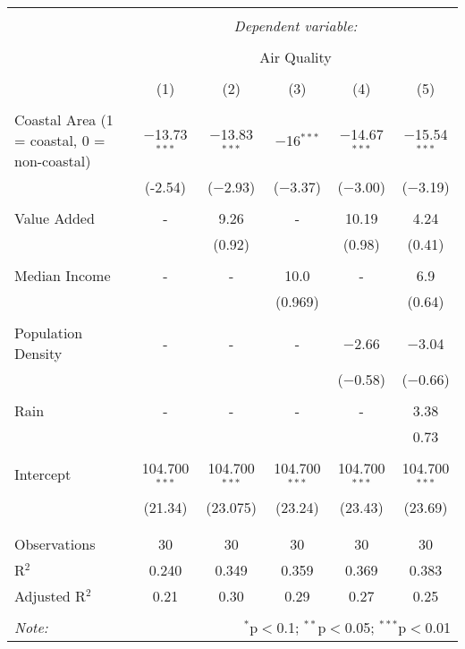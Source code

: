 \documentclass[
]{article}
\begin{document}
\begin{table}[!htbp] \centering 
  \label{} 
\begin{tabular}{@{\extracolsep{5pt}}lccccc} 
\\[-1.8ex]\hline 
\hline \\[-1.8ex] 
 & \multicolumn{5}{c}{\textit{Dependent variable:}} \\ 
\cline{2-6} 
\\[-1.8ex] & \multicolumn{5}{c}{Air Quality} \\ 
\\[-1.8ex] & (1) & (2) & (3) & (4) & (5)\\ 
\hline \\[-1.8ex] 
 Coastal Area (1 = coastal, 0 = non-coastal) & $-$13.73$^{***}$ & $-$13.83$^{***}$ & $-$16$^{***}$ & $-$14.67$^{***}$ & $-$15.54$^{***}$ \\ 
  & (-2.54) & ($-$2.93) & ($-$3.37) & ($-$3.00) & ($-$3.19) \\ 
  & & & & & \\ 
 Value Added & - & 9.26 & - & 10.19 & 4.24 \\ 
  &  & (0.92) &  & (0.98) & (0.41) \\ 
  & & & & & \\ 
 Median Income & - & - & 10.0 & - & 6.9 \\ 
  &  &  & (0.969) &  & (0.64) \\ 
  & & & & & \\ 
 Population Density & - & - & - & $-$2.66 & $-$3.04 \\ 
  &  &  &  & ($-$0.58) & ($-$0.66) \\ 
  & & & & & \\ 
  Rain  & - & - & - & - & 3.38 \\ 
  &  &  &  & & 0.73 \\ 
  & & & & & \\ 
 Intercept & 104.700$^{***}$ & 104.700$^{***}$ & 104.700$^{***}$ & 104.700$^{***}$ & 104.700$^{***}$ \\ 
  & (21.34) & (23.075) & (23.24) & (23.43) & (23.69) \\ 
  & & & & & \\ 
\hline \\[-1.8ex] 
Observations & 30 & 30 & 30 & 30 & 30 \\ 
R$^{2}$ & 0.240 & 0.349 & 0.359 & 0.369 & 0.383 \\ 
Adjusted R$^{2}$ & 0.21 & 0.30 & 0.29 & 0.27 & 0.25 \\ 
\hline 
\hline \\[-1.8ex] 
\textit{Note:}  & \multicolumn{5}{r}{$^{*}$p$<$0.1; $^{**}$p$<$0.05; $^{***}$p$<$0.01} \\ 
\end{tabular} 
\end{table}
\end{document}
